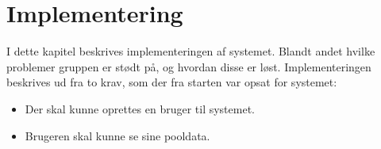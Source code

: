 \chapter{Implementering}

I dette kapitel beskrives implementeringen af systemet. Blandt andet hvilke problemer gruppen er stødt på, og hvordan disse er løst. 
Implementeringen beskrives ud fra to krav, som der fra starten var opsat for systemet:

\begin{itemize}
	\item Der skal kunne oprettes en bruger til systemet.
	\item Brugeren skal kunne se sine pooldata.
\end{itemize}



